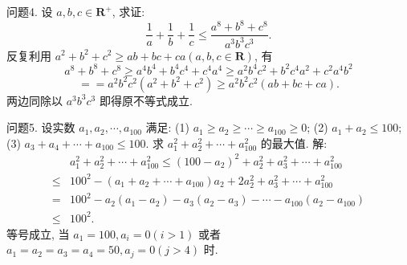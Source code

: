问题4. 设 $a, b, c \in \mathbf{R}^{+}$, 求证:
$$
\frac{1}{a}+\frac{1}{b}+\frac{1}{c} \leqslant \frac{a^8+b^8+c^8}{a^3 b^3 c^3} .
$$
反复利用 $a^2+b^2+c^2 \geqslant a b+b c+c a(a, b, c \in \mathbf{R})$, 有
$$
a^8+b^8+c^8 \geqslant a^4 b^4+b^4 c^4+c^4 a^4 \geqslant a^2 b^4 c^2+b^2 c^4 a^2+c^2 a^4 b^2
$$
$$
==a^2 b^2 c^2\left(a^2+b^2+c^2\right) \geqslant a^2 b^2 c^2(a b+b c+c a) .
$$
两边同除以 $a^3 b^3 c^3$ 即得原不等式成立.



问题5. 设实数 $a_1, a_2, \cdots, a_{100}$ 满足:
(1) $a_1 \geqslant a_2 \geqslant \cdots \geqslant a_{100} \geqslant 0$;
(2) $a_1+a_2 \leqslant 100$;
(3) $a_3+a_4+\cdots+a_{100} \leqslant 100$.
求 $a_1^2+a_2^2+\cdots+a_{100}^2$ 的最大值.
解:$$
\begin{aligned}
& a_1^2+a_2^2+\cdots+a_{100}^2 \leqslant\left(100-a_2\right)^2+a_2^2+a_3^2+\cdots+a_{100}^2 \\
\leqslant & 100^2-\left(a_1+a_2+\cdots+a_{100}\right) a_2+2 a_2^2+a_3^2+\cdots+a_{100}^2 \\
= & 100^2-a_2\left(a_1-a_2\right)-a_3\left(a_2-a_3\right)-\cdots-a_{100}\left(a_2-a_{100}\right) \\
\leqslant & 100^2 .
\end{aligned}
$$
等号成立, 当 $a_1=100, a_i=0(i>1)$ 或者 $a_1=a_2=a_3=a_4=50, a_j= 0(j>4)$ 时.



